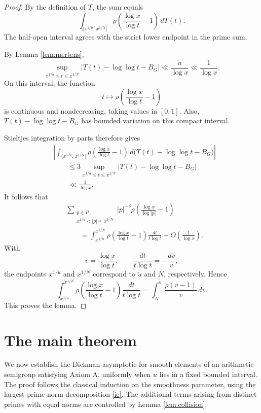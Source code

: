 \documentclass[a4paper]{amsart}
\begin{document}
\begin{proof}
By the definition of $T$, the sum equals
\[
\int_{(x^{1/\tilde u},\,x^{1/N}]}
\rho\!\left(\frac{\log x}{\log t}-1\right)\,dT(t).
\]
The half-open interval agrees with the strict lower
endpoint in the prime sum.

By Lemma \ref{lem:mertens},
\[
\sup_{x^{1/\tilde u}\le t\le x^{1/N}}
|T(t)-\log\log t-B_G|
\ll\frac{\tilde u}{\log x}
\ll\frac1{\log x}.
\]
On this interval, the function
\[
t\longmapsto
\rho\!\left(\frac{\log x}{\log t}-1\right)
\]
is continuous and nondecreasing, taking values in $[0,1]$.
Also, $T(t)-\log\log t-B_G$ has bounded variation on this
compact interval.

Stieltjes integration by parts therefore gives
\begin{align*}
&\left|
\int_{(x^{1/\tilde u},\,x^{1/N}]}
\rho\!\left(\frac{\log x}{\log t}-1\right)
\,d\bigl(T(t)-\log\log t-B_G\bigr)
\right|\\
&\qquad\le
3\sup_{x^{1/\tilde u}\le t\le x^{1/N}}
|T(t)-\log\log t-B_G|\\
&\qquad\ll\frac1{\log x}.
\end{align*}
It follows that
\begin{align*}
&\sum_{\substack{p\in P\\
x^{1/\tilde u}<|p|\le x^{1/N}}}
|p|^{-\delta}
\rho\!\left(\frac{\log x}{\log|p|}-1\right)\\
&\qquad=
\int_{x^{1/\tilde u}}^{x^{1/N}}
\rho\!\left(\frac{\log x}{\log t}-1\right)
\frac{dt}{t\log t}
+O\!\left(\frac1{\log x}\right).
\end{align*}
With
\[
v=\frac{\log x}{\log t},
\qquad
\frac{dt}{t\log t}=-\frac{dv}{v},
\]
the endpoints $x^{1/\tilde u}$ and $x^{1/N}$ correspond
to $\tilde u$ and $N$, respectively. Hence
\[
\int_{x^{1/\tilde u}}^{x^{1/N}}
\rho\!\left(\frac{\log x}{\log t}-1\right)
\frac{dt}{t\log t}
=
\int_N^{\tilde u}\frac{\rho(v-1)}v\,dv.
\]
This proves the lemma.
\end{proof}


\section{The main theorem}\label{sec:main}
We now establish the Dickman asymptotic for smooth
elements of an arithmetic semigroup satisfying Axiom A,
uniformly when $u$ lies in a fixed bounded interval.
The proof follows the classical induction on the
smoothness parameter, using the largest-prime-norm
decomposition \eqref{ie}. The additional terms arising
from distinct primes with equal norms are controlled
by Lemma \ref{lem:collision}.
\end{document}

